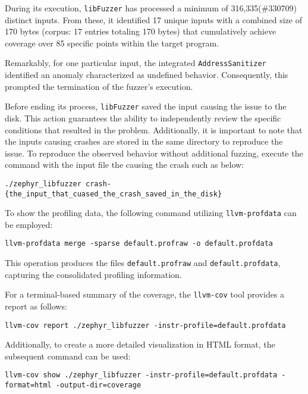 During its execution, \texttt{libFuzzer} has processed a minimum of
316,335(\#330709) distinct inputs. From these, it identified 17 unique
inputs with a combined size of 170 bytes (corpus: 17 entries totaling 170 bytes)
that cumulatively achieve coverage over 85 specific points within the target program.

Remarkably, for one particular input, the integrated \texttt{AddressSanitizer}~\cite{GitHubgo55:online}
identified an anomaly characterized as undefined behavior. Consequently, this prompted
the termination of the fuzzer's execution.

Before ending its process, \texttt{libFuzzer} saved the input causing the issue
to the disk. This action guarantees the ability to independently review the
specific conditions that resulted in the problem. Additionally,
it is important to note that the inputs causing crashes are stored in the same
directory to reproduce the issue. To reproduce the observed
behavior without additional fuzzing, execute the command with the input file
the causing the crash such as below:

\begin{verbatim}
./zephyr_libfuzzer crash-{the_input_that_cuased_the_crash_saved_in_the_disk}
\end{verbatim}

To show the profiling data, the following command utilizing \texttt{llvm-profdata} can be employed:

\begin{verbatim}
llvm-profdata merge -sparse default.profraw -o default.profdata
\end{verbatim}

This operation produces the files \texttt{default.profraw} and \texttt{default.profdata}, capturing the consolidated profiling information.

For a terminal-based summary of the coverage, the \texttt{llvm-cov} tool provides a report as follows:

\begin{verbatim}
llvm-cov report ./zephyr_libfuzzer -instr-profile=default.profdata
\end{verbatim}

Additionally, to create a more detailed visualization in HTML format, the
subsequent command can be used:

\begin{verbatim}
llvm-cov show ./zephyr_libfuzzer -instr-profile=default.profdata -format=html -output-dir=coverage
\end{verbatim}

